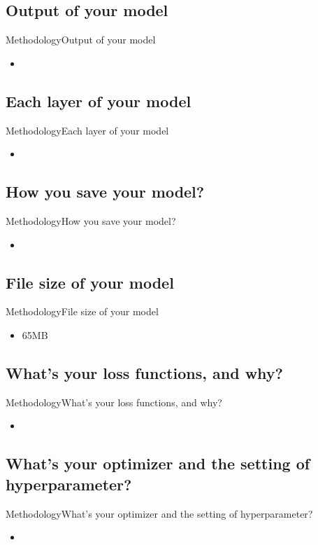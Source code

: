\documentclass{beamer}
\begin{document}
\begin{CJK*}{UTF8}{bsmi}
\subsection*{Output of your model}
\begin{frame}{Methodology}{Output of your model}
  \begin{itemize}
  \item {
  }
  \end{itemize}
\end{frame}
\subsection*{Each layer of your model}
\begin{frame}{Methodology}{Each layer of your model}
  \begin{itemize}
  \item {
  }
  \end{itemize}
\end{frame}
\subsection*{How you save your model?}
\begin{frame}{Methodology}{How you save your model?}
  \begin{itemize}
  \item {
  }
  \end{itemize}
\end{frame}
\subsection*{File size of your model}
\begin{frame}{Methodology}{File size of your model}
  \begin{itemize}
  \item {
65MB
  }
  \end{itemize}
\end{frame}
\subsection*{What's your loss functions, and why?}
\begin{frame}{Methodology}{What’s your loss functions, and why?}
  \begin{itemize}
  \item {
  }
  \end{itemize}
\end{frame}
\subsection*{What’s your optimizer and the setting of hyperparameter?}
\begin{frame}{Methodology}{What’s your optimizer and the setting of hyperparameter?}
  \begin{itemize}
  \item {
  }
  \end{itemize}
\end{frame}


\end{CJK*}
\end{document}
